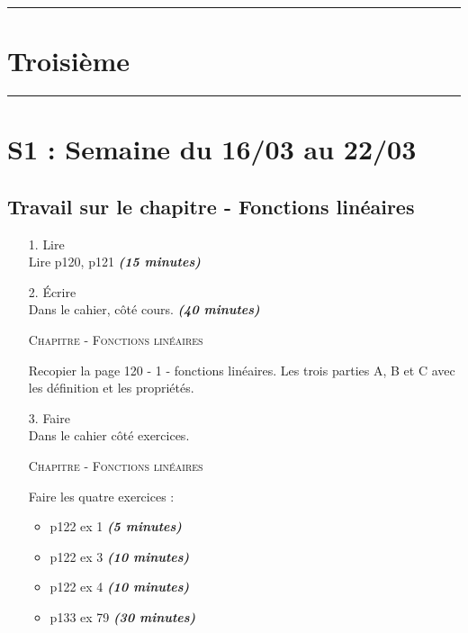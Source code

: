 \documentclass[11pt]{article}
\newcommand{\horrule}[1]{\rule{\linewidth}{#1}} %
\newcommand{\tempsexo}[1]{\textit{\textbf{(#1)}}}
\begin{document}

\newtheorem{Definition}{Définition}
\newtheorem{Theorem}{Théorème}
\newtheorem{Proposition}{Propriété}

\renewcommand{\labelitemi}{$\bullet$}
\renewcommand{\labelitemii}{$\circ$}

\setlength{\columnseprule}{1pt}

\horrule{2px}
\section*{Troisième}
\horrule{2px}

\section{S1 : Semaine du 16/03 au 22/03}

\subsection{Travail sur le chapitre - Fonctions linéaires}

\begin{enumerate}
\item[1.] \huge{Lire} \\ \normalsize 
Lire p120, p121 \tempsexo{15 minutes}

\item[2.] \huge{Écrire} \\ \normalsize 
  Dans le cahier, côté cours. \tempsexo{40 minutes}

	\textsc{Chapitre - Fonctions linéaires}
	
	Recopier la page 120 - 1 - fonctions linéaires. Les trois parties A, B et C avec les définition et les propriétés.

\item[3.] \huge{Faire} \\ \normalsize 
Dans le cahier côté exercices. 

	\textsc{Chapitre - Fonctions linéaires}
	
	Faire les quatre exercices :
	\begin{itemize}
  	\item p122 ex 1 \tempsexo{5 minutes}
	\item p122 ex 3 \tempsexo{10 minutes}
	\item p122 ex 4 \tempsexo{10 minutes}
	\item p133 ex 79 \tempsexo{30 minutes}
  \end{itemize}

\end{enumerate}		
\end{document}
